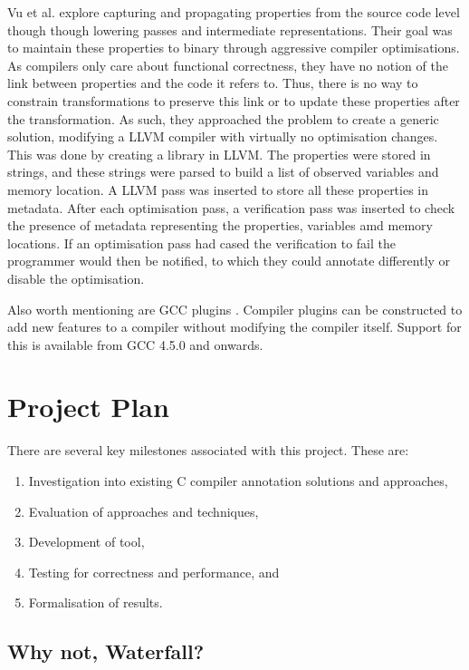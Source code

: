 \documentclass[twocolumn]{article}
\begin{document}
Vu et al. \cite{vu2020secure} explore capturing and propagating properties from the source code level though though lowering passes and intermediate representations. Their goal was to maintain these properties to binary through aggressive compiler optimisations. As compilers only care about functional correctness, they have no notion of the link between properties and the code it refers to. Thus, there is no way to constrain transformations to preserve this link or to update these properties after the transformation. As such, they approached the problem to create a generic solution, modifying a LLVM compiler with virtually no optimisation changes. This was done by creating a library in LLVM. The properties were stored in strings, and these strings were parsed to build a list of observed variables and memory location. A LLVM pass was inserted to store all these properties in metadata. After each optimisation pass, a verification pass was inserted to check the presence of metadata representing the properties, variables amd memory locations. If an optimisation pass had cased the verification to fail the programmer would then be notified, to which they could annotate differently or disable the optimisation.

Also worth mentioning are GCC plugins \cite{gccplugins}. Compiler plugins can be constructed to add new features to a compiler without modifying the compiler itself. Support for this is available from GCC 4.5.0 and onwards.

\clearpage
\onecolumn
\section{Project Plan}
There are several key milestones associated with this project. These are:
\begin{enumerate}
    \item Investigation into existing C compiler annotation solutions and approaches,
    \item Evaluation of approaches and techniques,
    \item Development of tool, 
    \item Testing for correctness and performance, and
    \item Formalisation of results.
\end{enumerate}

\subsection{Why not, Waterfall?}
\end{document}
